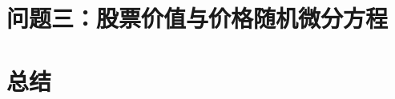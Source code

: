 \documentclass{article}
\begin{document}
\section{问题三：股票价值与价格随机微分方程}





\section{总结}









\end{document}
